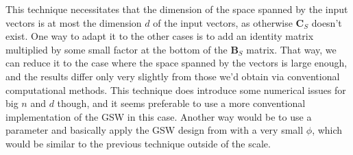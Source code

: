 \documentclass[12pt]{article}
\begin{document}
This technique necessitates that the dimension of the space spanned by the input vectors is at most the dimension $d$ of the input vectors, as otherwise $\textbf{C}_S$ doesn't exist. One way to adapt it to the other cases is to add an identity matrix multiplied by some small factor at the bottom of the $\textbf{B}_S$ matrix. That way, we can reduce it to the case where the space spanned by the vectors is large enough, and the results differ only very slightly from those we'd obtain via conventional computational methods. This technique does introduce some numerical issues for big $n$ and $d$ though, and it seems preferable to use a more conventional implementation of the GSW in this case. Another way would be to use a parameter and basically apply the GSW design from\cite{harshaw2019balancing} with a very small $\phi$, which would be similar to the previous technique outside of the scale.
\end{document}
